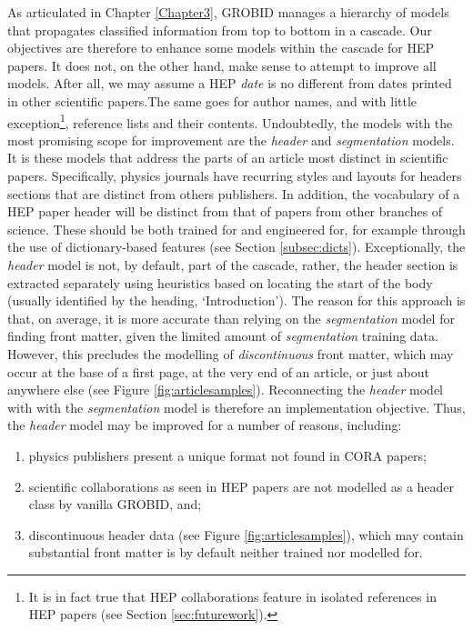 As articulated in Chapter \ref{Chapter3}, GROBID manages a hierarchy of models that propagates classified information from top to bottom in a cascade. Our objectives are therefore to enhance some models within the cascade for HEP papers. It does not, on the other hand, make sense to attempt to improve all models. After all, we may assume a HEP \emph{date} is no different from dates printed in other scientific papers.The same goes for author names, and with little exception\footnote{It is in fact true that HEP collaborations feature in isolated references in HEP papers (see Section \ref{sec:futurework}).}, reference lists and their contents. Undoubtedly, the models with the most promising scope for improvement are the \emph{header} and \emph{segmentation} models. It is these models that address the parts of an article most distinct in scientific papers. Specifically, physics journals have recurring styles and layouts for headers sections that are distinct from others publishers. In addition, the vocabulary of a HEP paper header will be distinct from that of papers from other branches of science. These should be both trained for and engineered for, for example through the use of dictionary-based features (see Section \ref{subsec:dicts}). Exceptionally, the \emph{header} model is not, by default, part of the cascade, rather, the header section is extracted separately using heuristics based on locating the start of the body (usually identified by the heading, `Introduction'). The reason for this approach is that, on average, it is more accurate than relying on the \emph{segmentation} model for finding front matter, given the limited amount of \emph{segmentation} training data. However, this precludes the modelling of \emph{discontinuous} front matter, which may occur at the base of a first page, at the very end of an article, or just about anywhere else (see Figure \ref{fig:articlesamples}). Reconnecting the \emph{header} model with with the \emph{segmentation} model is therefore an implementation objective. Thus, the \emph{header} model may be improved for a number of reasons, including:

\begin{enumerate}
\item physics publishers present a unique format not found in CORA papers;
\item scientific collaborations as seen in HEP papers are not modelled as a header class by vanilla GROBID, and;
\item discontinuous header data (see Figure \ref{fig:articlesamples}), which may contain substantial front matter is by default neither trained nor modelled for.
\end{enumerate}

